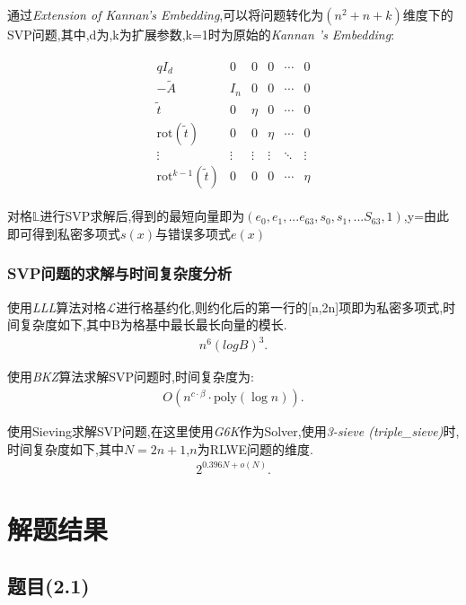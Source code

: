 \documentclass[12pt,a4paper]{article}
\numberwithin{equation}{section}
\begin{document}
通过\textit{Extension of Kannan’s Embedding}\cite{albrecht2018},可以将问题转化为$(n^2+n+k)$维度下的SVP问题,其中,d为,k为扩展参数,k=1时为原始的\textit{Kannan 's Embedding}:

\begin{align}
\begin{matrix}
qI_d & 0 & 0 & 0 & \cdots & 0 \\
-\tilde{A} & I_n & 0 & 0 & \cdots & 0 \\
\tilde{t} & 0 & \eta & 0 & \cdots & 0 \\
\text{rot}(\tilde{t}) & 0 & 0 & \eta & \cdots & 0 \\
\vdots & \vdots & \vdots & \vdots & \ddots & \vdots \\
\text{rot}^{k-1}(\tilde{t}) & 0 & 0 & 0 & \cdots & \eta
\end{matrix}
\end{align}

对格$\mathbb{L}$进行SVP求解后,得到的最短向量即为$(e_0,e_1,...e_{63},s_0,s_1,...S_{63},1)$,y=由此即可得到私密多项式$s(x)$与错误多项式$e(x)$

\subsubsection{SVP问题的求解与时间复杂度分析}

使用\textit{LLL}算法\cite{lenstraFactoringPolynomialsRational1982}对格$\mathcal{L}$进行格基约化,则约化后的第一行的[n,2n]项即为私密多项式,时间复杂度如下,其中B为格基中最长最长向量的模长\cite{adleman1981}.
\begin{align}
n^6 (logB)^3.
\end{align}

使用\textit{BKZ}算法求解SVP问题时,时间复杂度为:
\begin{align}
O\left(n^{c \cdot \beta} \cdot \text{poly}(\log n)\right).
\end{align}

使用Sieving求解SVP问题,在这里使用\textit{G6K}\cite{cryptoeprint:2019/089}作为Solver,使用\textit{3-sieve (triple\_sieve)}时,
时间复杂度如下,其中$N=2n+1$,$n$为RLWE问题的维度.
\begin{align}
2^{0.396N+o(N)}.
\end{align}


\section{解题结果}

\subsection{题目(2.1)}
\end{document}
